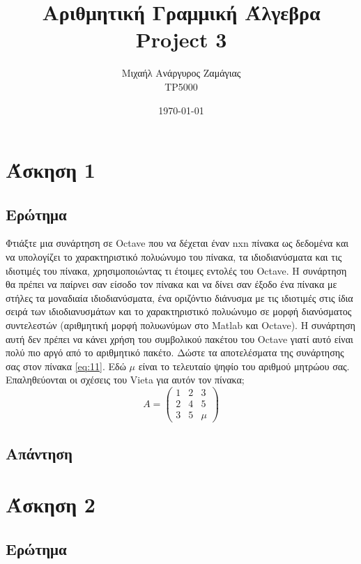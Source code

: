 \documentclass[12pt, fleqn, leqno]{extreport}
\begin{document}
\title{Αριθμητική Γραμμική Άλγεβρα\\Project 3}
\author{Μιχαήλ Ανάργυρος Ζαμάγιας\\TP5000}
\date{\today}
\maketitle
\newpage

\tableofcontents

\chapter{Άσκηση 1}
\section{Ερώτημα}
Φτιάξτε μια συνάρτηση σε Octave που να δέχεται έναν nxn πίνακα ως δεδομένα και να υπολογίζει το χαρακτηριστικό πολυώνυμο του πίνακα, τα ιδιοδιανύσματα και τις ιδιοτιμές του πίνακα, χρησιμοποιώντας τι έτοιμες εντολές του Octave. Η συνάρτηση θα πρέπει να παίρνει σαν είσοδο τον πίνακα και να δίνει σαν έξοδο ένα πίνακα με στήλες τα μοναδιαία ιδιοδιανύσματα, ένα οριζόντιο διάνυσμα με τις ιδιοτιμές στις ίδια σειρά των ιδιοδιανυσμάτων και το χαρακτηριστικό πολυώνυμο σε μορφή διανύσματος συντελεστών (αριθμητική μορφή πολυωνύμων στο Matlab και Octave). Η συνάρτηση αυτή δεν πρέπει να κάνει χρήση του συμβολικού πακέτου του Octave γιατί αυτό είναι πολύ πιο αργό από το αριθμητικό πακέτο. Δώστε τα αποτελέσματα της συνάρτησης σας στον πίνακα \eqref{eq:11}. Εδώ $\mu$ είναι το τελευταίο ψηφίο του αριθμού μητρώου σας. Επαληθεύονται οι σχέσεις του Vieta για αυτόν τον πίνακα;
\begin{equation}%
    A = \begin{pmatrix}
        1 & 2 & 3   \\
        2 & 4 & 5   \\
        3 & 5 & \mu
    \end{pmatrix}\label{eq:11}
\end{equation}

\newpage
\section{Απάντηση}

\chapter{Άσκηση 2}
\section{Ερώτημα}
\end{document}
